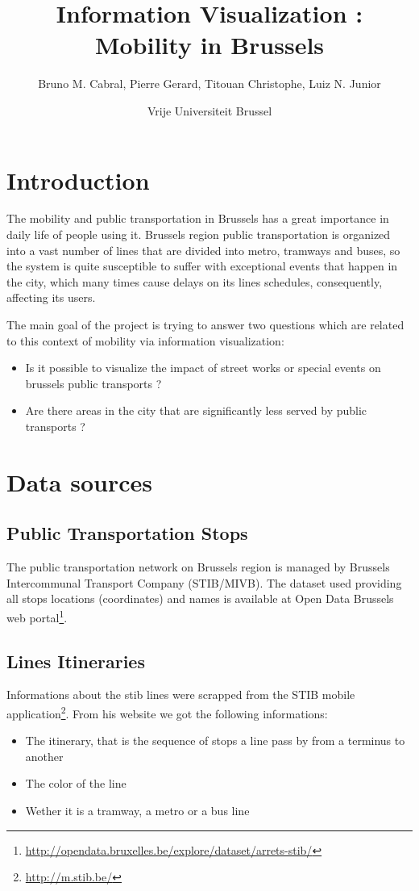 \documentclass[12pt]{article}%
\begin{document}
\title{Information Visualization : Mobility in Brussels}
\author{Bruno M. Cabral, Pierre Gerard, Titouan Christophe, Luiz N. Junior}
\date{Vrije Universiteit Brussel}
\maketitle


\section{Introduction}
The mobility and public transportation in Brussels has a great importance in daily life of people using it.  Brussels region public transportation is organized into a vast number of lines that are divided into metro, tramways and buses, so the system is quite susceptible to suffer with exceptional events that happen in the city, which many times cause delays on its lines schedules, consequently, affecting its users.

The main goal of the project is trying to answer two questions which are related to this context of mobility via information visualization:

\begin{itemize}
	\item Is it possible to visualize the impact of street works or special events on brussels public transports ?
	\item Are there areas in the city that are significantly less served by public transports ?
\end{itemize}


\section{Data sources}
\subsection{Public Transportation Stops}
The public transportation network on Brussels region is managed by Brussels Intercommunal Transport Company (STIB/MIVB). The dataset used providing all stops locations (coordinates) and names is available at Open Data Brussels web portal\footnote{\url{http://opendata.bruxelles.be/explore/dataset/arrets-stib/}}.

\subsection{Lines Itineraries}
Informations about the stib lines were scrapped from the STIB mobile application\footnote{\url{http://m.stib.be/}}. From his website we got the following informations:
\begin{itemize}
    \item The itinerary, that is the sequence of stops a line pass by from a terminus to another
    \item The color of the line
    \item Wether it is a tramway, a metro or a bus line
\end{itemize}
\end{document}
